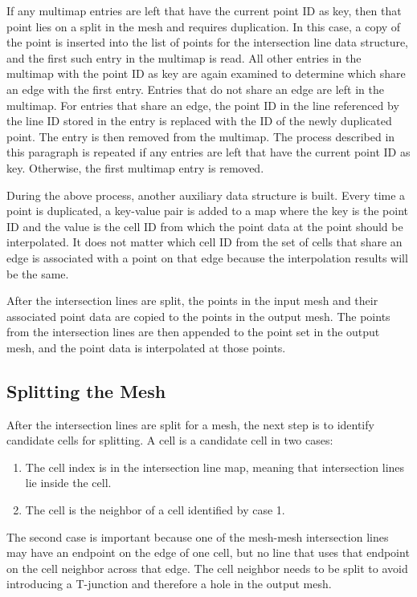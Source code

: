 \documentclass{InsightArticle}
\begin{document}
If any multimap entries are left that have the current point ID as key, then that point lies on a split in the mesh and requires duplication. In this case, a copy of the point is inserted into the list of points for the intersection line data structure, and the first such entry in the multimap is read. All other entries in the multimap with the point ID as key are again examined to determine which share an edge with the first entry. Entries that do not share an edge are left in the multimap. For entries that share an edge, the point ID in the line referenced by the line ID stored in the entry is replaced with the ID of the newly duplicated point. The entry is then removed from the multimap. The process described in this paragraph is repeated if any entries are left that have the current point ID as key. Otherwise, the first multimap entry is removed.

During the above process, another auxiliary data structure is built. Every time a point is duplicated, a key-value pair is added to a map where the key is the point ID and the value is the cell ID from which the point data at the point should be interpolated. It does not matter which cell ID from the set of cells that share an edge is associated with a point on that edge because the interpolation results will be the same.

After the intersection lines are split, the points in the input mesh and their associated point data are copied to the points in the output mesh. The points from the intersection lines are then appended to the point set in the output mesh, and the point data is interpolated at those points. 

\subsection{Splitting the Mesh}

After the intersection lines are split for a mesh, the next step is to identify candidate cells for splitting. A cell is a candidate cell in two cases:

\begin{enumerate}
\item The cell index is in the intersection line map, meaning that intersection lines lie inside the cell.
\item The cell is the neighbor of a cell identified by case 1.
\end{enumerate}

The second case is important because one of the mesh-mesh intersection lines may have an endpoint on the edge of one cell, but no line that uses that endpoint on the cell neighbor across that edge. The cell neighbor needs to be split to avoid introducing a T-junction and therefore a hole in the output mesh.
\end{document}
